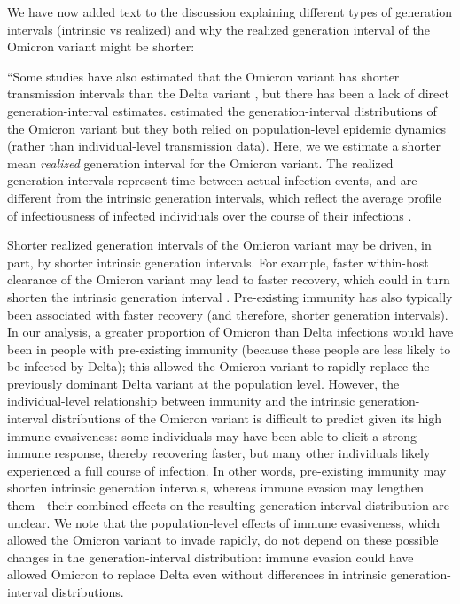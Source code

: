 \documentclass[12pt]{article}
\begin{document}
We have now added text to the discussion explaining different types of generation intervals (intrinsic vs realized) and why the realized generation interval of the Omicron variant might be shorter:

``Some studies have also estimated that the Omicron variant has shorter transmission intervals than the Delta variant \citep{abbott2022test,kremer2022observed,song2022serial}, but there has been a lack of direct generation-interval estimates.
\cite{ito2022estimating,selby2022generation} estimated the generation-interval distributions of the Omicron variant but they both relied on population-level epidemic dynamics (rather than individual-level transmission data).
Here, we we estimate a shorter mean \emph{realized} generation interval for the Omicron variant.
The realized generation intervals represent time between actual infection events, and are different from the intrinsic generation intervals, which reflect the average profile of infectiousness of infected individuals over the course of their infections \citep{champredon2015intrinsic}.

Shorter realized generation intervals of the Omicron variant may be driven, in part, by shorter intrinsic generation intervals.
For example, faster within-host clearance of the Omicron variant \citep{hay2022viral} may lead to faster recovery, which could in turn shorten the intrinsic generation interval \citep{roberts2007model}.
Pre-existing immunity has also typically been associated with faster recovery \citep{kissler2021viral} (and therefore, shorter generation intervals).
In our analysis, a greater proportion of Omicron than Delta infections would have been in people with pre-existing immunity (because these people are less likely to be infected by Delta);
this allowed the Omicron variant to rapidly replace the previously dominant Delta variant at the population level.
However, the individual-level relationship between immunity and the intrinsic generation-interval distributions of the Omicron variant is difficult to predict given its high immune evasiveness:
some individuals may have been able to elicit a strong immune response, thereby recovering faster, but many other individuals likely experienced a full course of infection.
In other words, pre-existing immunity may shorten intrinsic generation intervals, whereas immune evasion may lengthen them---their combined effects on the resulting generation-interval distribution are unclear.
We note that the population-level effects of immune evasiveness, which allowed the Omicron variant to invade rapidly, do not depend on these possible changes in the generation-interval distribution:
immune evasion could have allowed Omicron to replace Delta even without differences in intrinsic generation-interval distributions.
\end{document}
